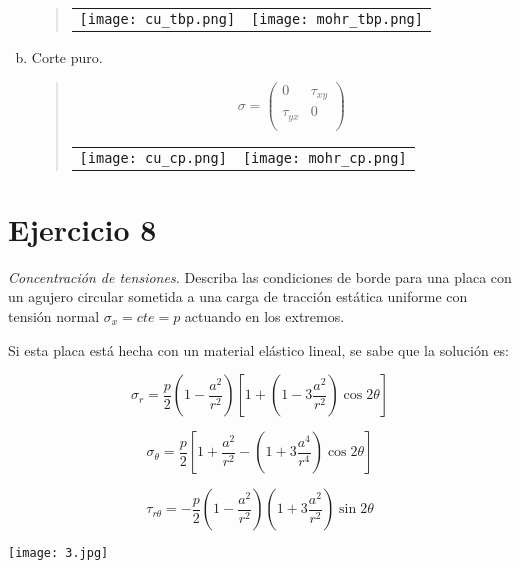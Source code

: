 \documentclass[a4paper,12pt,twoside,final,spanish]{article}
\begin{document}
\begin{enumerate}[a.]
\begin{quote}
\begin{center}
\begin{tabular}{c c}
\texttt{[image: cu\_tbp.png]} &
\texttt{[image: mohr\_tbp.png]}
\end{tabular}
\end{center}
\end{quote}

\item Corte puro.

\begin{quote}
\[
\sigma=
\left(\begin{matrix}
0 & \tau_{xy} \\
\tau_{yx} & 0 \\
\end{matrix}\right)
\]

\begin{center}
\begin{tabular}{c c}
\texttt{[image: cu\_cp.png]} &
\texttt{[image: mohr\_cp.png]}
\end{tabular}
\end{center}
\end{quote}

\end{enumerate}

\section*{Ejercicio 8}

\textit{Concentración de tensiones.} Describa las condiciones de borde para una placa con un agujero circular sometida a una carga de tracción estática uniforme con tensión normal $\sigma_{x}=cte=p$ actuando en los extremos.
 
Si esta placa está hecha con un material elástico lineal, se sabe que la solución es: 

\[
\sigma_{r}=\frac{p}{2}\left(1-\frac{a^{2}}{r^{2}}\right)\left[1+\left(1-3\frac{a^{2}}{r^{2}}\right)\cos{2\theta}\right]
\]

\[
\sigma_{\theta}=\frac{p}{2}\left[1+\frac{a^{2}}{r^{2}}-\left(1+3\frac{a^{4}}{r^{4}}\right)\cos{2\theta}\right]
\]

\[
\tau_{r\theta}=-\frac{p}{2}\left(1-\frac{a^2}{r^2}\right)\left(1+3\frac{a^2}{r^2}\right)\sin{2\theta}
\]

\begin{center}
\texttt{[image: 3.jpg]}
\end{center}
\end{document}
